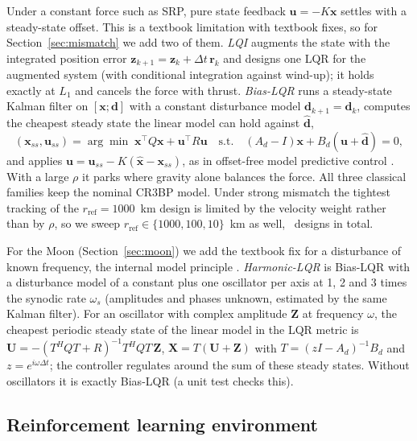 \documentclass[11pt,a4paper]{article}
\begin{document}
Under a constant force such as SRP, pure state feedback $\mathbf{u} = -K\mathbf{x}$
settles with a steady-state offset. This is a textbook limitation with
textbook fixes, so for Section~\ref{sec:mismatch} we add two of them.
\emph{LQI} augments the state with the integrated position error
$\mathbf{z}_{k+1} = \mathbf{z}_k + \Delta t\,\mathbf{r}_k$ and designs one LQR for
the augmented system (with conditional integration against wind-up); it holds
exactly at $L_1$ and cancels the force with thrust. \emph{Bias-LQR} runs a
steady-state Kalman filter on $[\mathbf{x}; \mathbf{d}]$ with a constant
disturbance model $\mathbf{d}_{k+1} = \mathbf{d}_k$, computes the cheapest steady
state the linear model can hold against $\hat{\mathbf{d}}$,
\begin{equation}
(\mathbf{x}_{ss}, \mathbf{u}_{ss}) = \arg\min\; \mathbf{x}^\top Q \mathbf{x} +
\mathbf{u}^\top R \mathbf{u}
\quad\text{s.t.}\quad (A_d - I)\mathbf{x} + B_d(\mathbf{u} + \hat{\mathbf{d}}) = 0,
\end{equation}
and applies $\mathbf{u} = \mathbf{u}_{ss} - K(\hat{\mathbf{x}} - \mathbf{x}_{ss})$,
as in offset-free model predictive control \cite{pannocchia2003}. With a large
$\rho$ it parks where gravity alone balances the force. All three classical
families keep the nominal CR3BP model. Under strong mismatch the tightest
tracking of the $r_\text{ref} = 1000$~km design is limited by the velocity
weight rather than by $\rho$, so we sweep $r_\text{ref} \in \{1000, 100,
10\}$~km as well, \mmDesigns\ designs in total.

For the Moon (Section~\ref{sec:moon}) we add the textbook fix for a disturbance
of known frequency, the internal model principle \cite{francis1976}.
\emph{Harmonic-LQR} is Bias-LQR with a disturbance model of a constant plus
one oscillator per axis at 1, 2 and 3 times the synodic rate $\omega_s$
(amplitudes and phases unknown, estimated by the same Kalman filter). For an
oscillator with complex amplitude $\mathbf{Z}$ at frequency $\omega$, the
cheapest periodic steady state of the linear model in the LQR metric is
$\mathbf{U} = -(T^{H} Q T + R)^{-1} T^{H} Q T\,\mathbf{Z}$,
$\mathbf{X} = T(\mathbf{U} + \mathbf{Z})$ with $T = (zI - A_d)^{-1} B_d$ and
$z = e^{i\omega\Delta t}$; the controller regulates around the sum of these
steady states. Without oscillators it is exactly Bias-LQR (a unit test checks
this).

\subsection{Reinforcement learning environment}
\end{document}
